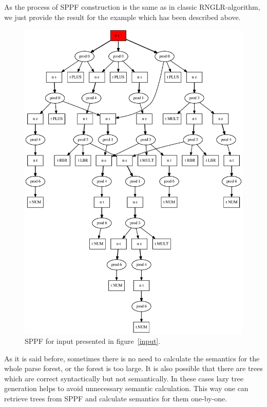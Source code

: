 \documentclass{sigplanconf}
\begin{document}
As the process of SPPF construction is the same as in classic RNGLR-algorithm, we just provide the result for the example which has been described above.

\begin{figure}[h!]
    \begin{center}
        \includegraphics[scale=0.3]{Graphs/ast.eps}
    \end{center}
    \caption{SPPF for input presented in figure~\ref{input}.}
    \label{sppf}
\end{figure}

As it is said before, sometimes there is no need to calculate the semantics for the whole parse forest, or the forest is too large. It is also possible that there are trees which are correct syntactically but not semantically. In these cases lazy tree generation helps to avoid unnecessary semantic calculation. This way one can retrieve trees from SPPF and calculate semantics for them one-by-one.  
\end{document}
